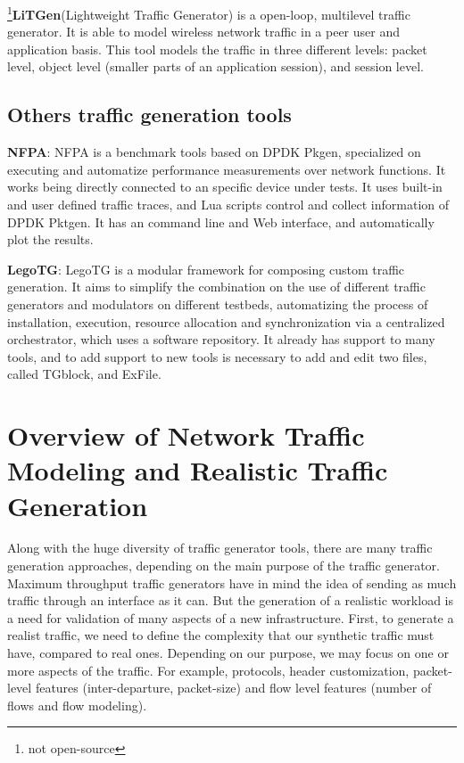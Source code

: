 \footnote{not open-source}\textbf{LiTGen}(Lightweight Traffic Generator)\cite{litgen-paper} is a open-loop, multilevel traffic generator. It is able to model wireless network traffic in a peer user and application basis. This tool models the traffic in three different levels: packet level, object level (smaller parts of an application session), and session level.


\subsection{Others traffic generation tools}


\textbf{NFPA}\cite{nfpa-paper}: NFPA is a benchmark tools based on DPDK Pkgen, specialized on executing and automatize performance measurements over network functions. It works being directly connected to an specific device under tests. It uses built-in and user defined traffic traces, and Lua scripts control and collect information of DPDK Pktgen. It has an command line and Web interface, and automatically plot the results.

\textbf{LegoTG}\cite{legotg-paper}: LegoTG is a modular framework for composing custom traffic generation. It aims to simplify the combination on the use of different traffic generators and modulators on different testbeds, automatizing the process of installation, execution, resource allocation and synchronization via a centralized orchestrator, which uses a software repository. It already has support to many tools, and to add support to new tools is necessary to add and edit two files, called TGblock, and ExFile.



\section{Overview of Network Traffic Modeling and Realistic Traffic Generation}


Along with the huge diversity of traffic generator tools, there are many traffic generation approaches, depending on the main purpose of the traffic generator. Maximum throughput traffic generators have in mind the idea of sending as much traffic through an interface as it can. But the generation of a realistic workload is a need for validation of many aspects of a new infrastructure. First, to generate a realist traffic, we need to define the complexity that our synthetic traffic must have, compared to real ones. Depending on our purpose, we may focus on one or more aspects of the traffic. For example, protocols, header customization, packet-level features (inter-departure, packet-size) and flow level features (number of flows and flow modeling).


